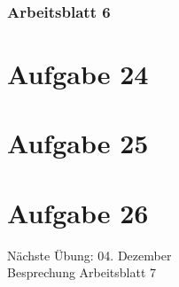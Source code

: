 \documentclass[9pt,german]{beamer}%
\begin{document}
\maketitle%
\addtocounter{framenumber}{-1}%

\begin{frame}
  \frametitle{Arbeitsblatt 6}%
\tableofcontents
\end{frame}
\setcounter{exercise}{23}

\section{Aufgabe 24}

\section{Aufgabe 25}

\section{Aufgabe 26}


\begin{frame}
\centering
\Huge{}
\vspace{2cm}

{\LARGE
N\"achste \"Ubung: 04. Dezember\\
Besprechung Arbeitsblatt 7
}
\end{frame}


\end{document}
